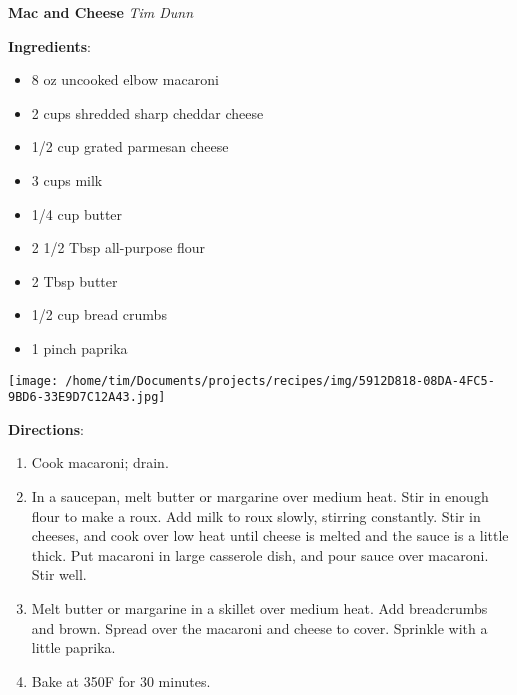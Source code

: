 \documentclass[11pt, twoside, openany]{book}
\begin{document}
\noindent\begin{minipage}[t]{\linewidth}%
{\Large\textbf{Mac and Cheese}} \label{mac-and-cheese}\hfill\textit{Tim Dunn}\\
\noindent\begin{minipage}[t]{0.78\linewidth}%
\textbf{Ingredients}:\vspace{-3mm}
\begin{multicols}{2}
\begin{itemize}\setlength\itemsep{-1mm}
\item 8 oz uncooked elbow macaroni
\item 2 cups shredded sharp cheddar cheese
\item 1/2 cup grated parmesan cheese
\item 3 cups milk
\item 1/4 cup butter
\item 2 1/2 Tbsp all-purpose flour
\item 2 Tbsp butter
\item 1/2 cup bread crumbs
\item 1 pinch paprika
\end{itemize}
\end{multicols}
\end{minipage}
\noindent\begin{minipage}[t]{0.18\linewidth}
\centering \strut\vspace*{-\baselineskip}\newline
\texttt{[image: /home/tim/Documents/projects/recipes/img/5912D818-08DA-4FC5-9BD6-33E9D7C12A43.jpg]}\\
\end{minipage}\vspace{3mm}
\textbf{Directions}:
\vspace{-3mm}\begin{enumerate}\setlength\itemsep{-1mm}
\item Cook macaroni; drain.
\item In a saucepan, melt butter or margarine over medium heat. Stir in enough flour to make a roux. Add milk to roux slowly, stirring constantly. Stir in cheeses, and cook over low heat until cheese is melted and the sauce is a little thick. Put macaroni in large casserole dish, and pour sauce over macaroni. Stir well.
\item Melt butter or margarine in a skillet over medium heat. Add breadcrumbs and brown. Spread over the macaroni and cheese to cover. Sprinkle with a little paprika.
\item Bake at 350F for 30 minutes.
\end{enumerate}
\end{minipage}\vspace{8mm}
\end{document}
